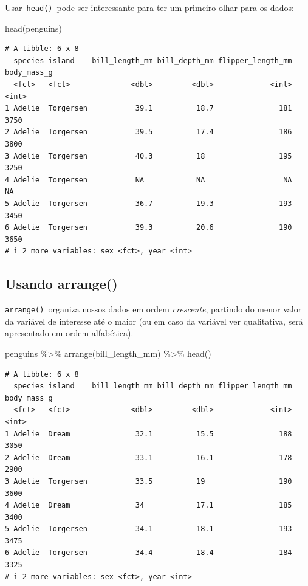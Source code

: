 \documentclass[
  12pt,
  letterpaper,
  DIV=11,
  numbers=noendperiod]{scrreprt}
\newenvironment{Shaded}{\begin{snugshade}}{\end{snugshade}}
\newcommand{\FunctionTok}[1]{\textcolor[rgb]{0.28,0.35,0.67}{#1}}
\newcommand{\NormalTok}[1]{\textcolor[rgb]{0.00,0.23,0.31}{#1}}
\newcommand{\SpecialCharTok}[1]{\textcolor[rgb]{0.37,0.37,0.37}{#1}}
\theoremstyle{definition}
\theoremstyle{exemplo}
\begin{document}
Usar~\texttt{head()}~pode ser interessante para ter um primeiro olhar
para os dados:

\begin{Shaded}
\begin{Highlighting}[]
\FunctionTok{head}\NormalTok{(penguins)}
\end{Highlighting}
\end{Shaded}

\begin{verbatim}
# A tibble: 6 x 8
  species island    bill_length_mm bill_depth_mm flipper_length_mm body_mass_g
  <fct>   <fct>              <dbl>         <dbl>             <int>       <int>
1 Adelie  Torgersen           39.1          18.7               181        3750
2 Adelie  Torgersen           39.5          17.4               186        3800
3 Adelie  Torgersen           40.3          18                 195        3250
4 Adelie  Torgersen           NA            NA                  NA          NA
5 Adelie  Torgersen           36.7          19.3               193        3450
6 Adelie  Torgersen           39.3          20.6               190        3650
# i 2 more variables: sex <fct>, year <int>
\end{verbatim}

\subsection{Usando arrange()}\label{usando-arrange}

\texttt{arrange()}~organiza nossos dados em ordem \emph{crescente},
partindo do menor valor da variável de interesse até o maior (ou em caso
da variável ver qualitativa, será apresentado em ordem alfabética).

\begin{Shaded}
\begin{Highlighting}[]
\NormalTok{penguins }\SpecialCharTok{\%\textgreater{}\%}
  \FunctionTok{arrange}\NormalTok{(bill\_length\_mm) }\SpecialCharTok{\%\textgreater{}\%}
  \FunctionTok{head}\NormalTok{()}
\end{Highlighting}
\end{Shaded}

\begin{verbatim}
# A tibble: 6 x 8
  species island    bill_length_mm bill_depth_mm flipper_length_mm body_mass_g
  <fct>   <fct>              <dbl>         <dbl>             <int>       <int>
1 Adelie  Dream               32.1          15.5               188        3050
2 Adelie  Dream               33.1          16.1               178        2900
3 Adelie  Torgersen           33.5          19                 190        3600
4 Adelie  Dream               34            17.1               185        3400
5 Adelie  Torgersen           34.1          18.1               193        3475
6 Adelie  Torgersen           34.4          18.4               184        3325
# i 2 more variables: sex <fct>, year <int>
\end{verbatim}
\end{document}
